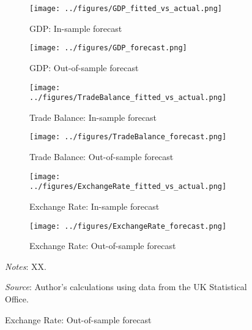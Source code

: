 \documentclass[
]{article}
\begin{document}
\begin{figure}[htbp]
    \centering
        \caption{\textsc{Forecast performance for UK GDP, Exchange Rate, and Trade Balance}}
    \label{fig:forecast_results}
    \begin{subfigure}[b]{0.45\textwidth}
        \texttt{[image: ../figures/GDP\_fitted\_vs\_actual.png]}
        \caption{GDP: In-sample forecast}
        \label{fig:gdp_in}
    \end{subfigure}
    \hfill
    \begin{subfigure}[b]{0.45\textwidth}
        \texttt{[image: ../figures/GDP\_forecast.png]}
        \caption{GDP: Out-of-sample forecast}
        \label{fig:gdp_out}
    \end{subfigure}
    
    \begin{subfigure}[b]{0.45\textwidth}
        \texttt{[image: ../figures/TradeBalance\_fitted\_vs\_actual.png]}
        \caption{Trade Balance: In-sample forecast}
        \label{fig:tb_in}
    \end{subfigure}
    \hfill
    \begin{subfigure}[b]{0.45\textwidth}
        \texttt{[image: ../figures/TradeBalance\_forecast.png]}
        \caption{Trade Balance: Out-of-sample forecast}
        \label{fig:tb_out}
    \end{subfigure}
    
    \begin{subfigure}[b]{0.45\textwidth}
        \texttt{[image: ../figures/ExchangeRate\_fitted\_vs\_actual.png]}
        \caption{Exchange Rate: In-sample forecast}
        \label{fig:er_in}
    \end{subfigure}
    \hfill
    \begin{subfigure}[b]{0.45\textwidth}
        \texttt{[image: ../figures/ExchangeRate\_forecast.png]}
        \caption{Exchange Rate: Out-of-sample forecast}
        \label{fig:er_out}
    \end{subfigure}
    
    \begin{minipage}{\textwidth}
\scriptsize
\textit{Notes}: XX.

\textit{Source}: Author's calculations using data from the UK Statistical Office.
\end{minipage}
\end{figure}
\end{document}
